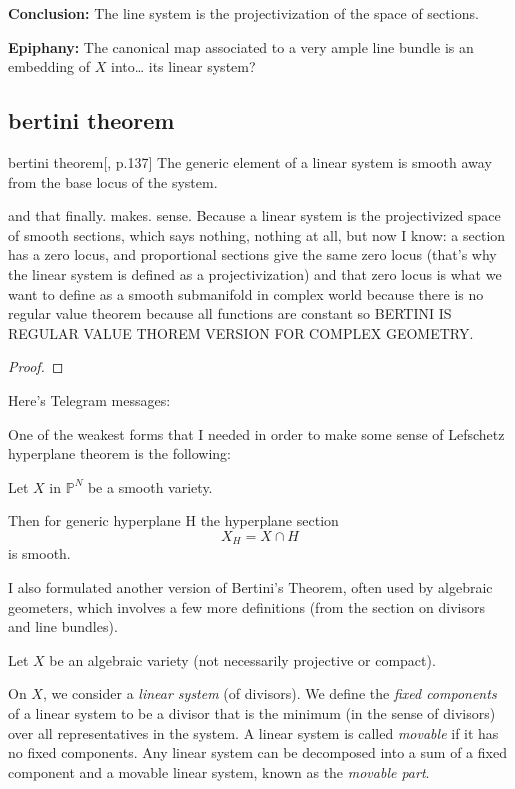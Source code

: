 \textbf{Conclusion:} The line system is the projectivization of the space of sections.

\textbf{Epiphany:} The canonical map associated to a very ample line bundle is an embedding of \( X \) into… its linear system?
\subsection{bertini theorem}

\begin{thing6}{bertini theorem}[\cite{gri}, p.137]\leavevmode
The generic element of a linear system is smooth away from the base locus of the system.
\end{thing6}

and that finally. makes. sense. Because a linear system is the projectivized space of smooth sections, which says nothing, nothing at all, but now I know: a section has a zero locus, and proportional sections give the same zero locus (that's why the linear system is defined as a projectivization) and that zero locus is what we want to define as a smooth submanifold in complex world because there is no regular value theorem because all functions are constant so BERTINI IS REGULAR VALUE THOREM VERSION FOR COMPLEX GEOMETRY.

\begin{proof}\leavevmode

\end{proof}

Here's Telegram messages:

One of the weakest forms that I needed in order to make some sense of Lefschetz hyperplane theorem is the following:

Let \(X\) in \(\mathbb{P}^N\) be a smooth variety.

Then for generic hyperplane H the hyperplane section
\[X_H=X \cap H\]
is smooth.

I also formulated another version of Bertini's Theorem, often used by algebraic geometers, which involves a few more definitions (from the section on divisors and line bundles).

Let \( X \) be an algebraic variety (not necessarily projective or compact).

On \( X \), we consider a \emph{linear system} (of divisors). We define the \emph{fixed components} of a linear system to be a divisor that is the minimum (in the sense of divisors) over all representatives in the system. A linear system is called \emph{movable} if it has no fixed components. Any linear system can be decomposed into a sum of a fixed component and a movable linear system, known as the \emph{movable part}.

